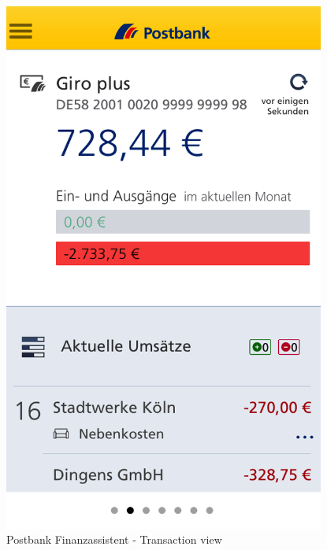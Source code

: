 \begin{figure}[H]
\begin{minipage}[b]{.5\linewidth}
        \centering\includegraphics[width=0.94\textwidth]{img/screenshots/ex3p4.png}
    \end{minipage}
	\captionsetup{labelformat=empty}
    \caption[]{Postbank Finanzassistent - Transaction view}
\end{figure}
